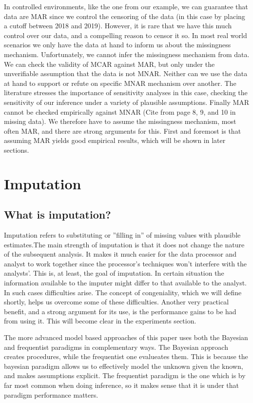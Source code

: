 \documentclass{article}
\begin{document}
	In controlled environments, like the one from our example, we can guarantee that data are MAR since we control the censoring of the data (in this case by placing a cutoff between 2018 and 2019). However, it is rare that we have this much control over our data, and a compelling reason to censor it so. In most real world scenarios we only have the data at hand to inform us about the missingness mechanism. Unfortunately, we cannot infer the missingness mechanism from data.  We can check the validity of MCAR against MAR, but only under the unverifiable assumption that the data is not MNAR. Neither can we use the data at hand to support or refute on specific MNAR mechanism over another. The literature stresses the importance of sensitivity analyses in this case, checking the sensitivity of our inference under a variety of plausible assumptions. Finally MAR cannot be checked empirically against MNAR  (Cite from page 8, 9, and 10 in missing data). We therefore have to assume the missingness mechanism, most often MAR, and there are strong arguments for this. First and foremost is that assuming MAR yields good empirical results, which will be shown in later sections. %
	
	\section{Imputation}
	
	\subsection{What is imputation?}
	Imputation refers to substituting or ''filling in'' of missing values with plausible estimates.The main strength of imputation is that it does not change the nature of the subsequent analysis. It makes it much easier for the data processor and analyst to work together since the processor's techniques won't interfere with the analysts'. This is, at least, the goal of imputation. In certain situation the information available to the imputer might differ to that available to the analyst. In such cases difficulties arise. The concept of congeniality, which we will define shortly, helps us overcome some of these difficulties. Another very practical benefit, and a strong argument for its use, is the performance gains to be had from using it. This will become clear in the experiments section.
	
	The more advanced model based approaches of this paper uses both the Bayesian and frequentist paradigms in complementary ways. The Bayesian approach creates procedures, while the frequentist one evalueates them. This is because the bayesian paradigm allows us to effectively model the unknown given the known, and makes assumptions explicit. The frequentist paradigm is the one which is by far most common when doing inference, so it makes sense that it is under that paradigm performance matters.
	
\end{document}
